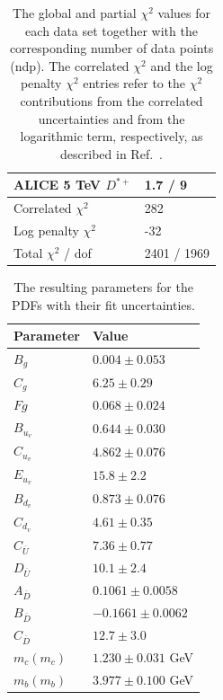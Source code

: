 \documentclass[12pt]{article}
\begin{document}
\begin{table}
\begin{tabular}{ll}
    ALICE 5 TeV $D^{*+}$ & 1.7 / 9  \\ 
    \hline
    Correlated $\chi^2$  & 282  \\ 
    Log penalty $\chi^2$  &  -32  \\ 
    \hline
    Total $\chi^2$ / dof  & 2401 / 1969  \\ 
\end{tabular}
\caption{The global and partial $\chi^2$ values for each data set together with the corresponding number of data points (ndp). The correlated $\chi^2$ and the log penalty $\chi^2$ entries refer to the $\chi^2$ contributions from the correlated uncertainties and from the logarithmic term, respectively, as described in Ref.~\cite{Abramowicz:2015mha}.}
\label{tab:chi}
\end{table}

\begin{table}
    \renewcommand*{\arraystretch}{1.12}
    \centering
\begin{tabular}{ll}
    Parameter & Value \\
    \hline
    $B_g$ & $0.004 \pm 0.053$  \\
    $C_g$ & $6.25 \pm 0.29$  \\
    $Fg$ & $0.068 \pm 0.024$  \\
    $B_{u_v}$ & $0.644 \pm 0.030$  \\
    $C_{u_v}$ & $4.862 \pm 0.076$  \\
    $E_{u_v}$ & $15.8 \pm 2.2$  \\
    $B_{d_v}$ & $0.873 \pm 0.076$  \\
    $C_{d_v}$ & $4.61 \pm 0.35$  \\
    $C_{\overline{U}}$ & $7.36 \pm 0.77$  \\
    $D_{\overline{U}}$ & $10.1 \pm 2.4$  \\
    $A_{\overline{D}}$ & $0.1061 \pm 0.0058$  \\
    $B_{\overline{D}}$ & $-0.1661 \pm 0.0062$  \\
    $C_{\overline{D}}$ & $12.7 \pm 3.0$  \\
    $m_c(m_c)$ & $1.230 \pm 0.031$ GeV  \\
    $m_b(m_b)$ & $3.977 \pm 0.100$ GeV  \\
\end{tabular}
\caption{The resulting parameters for the PDFs with their fit uncertainties.}
\label{tab:pars}
\end{table}
\end{document}
